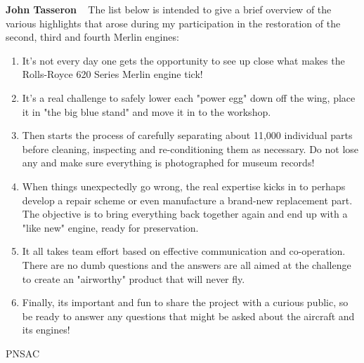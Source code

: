\textbf{John Tasseron}
 
The list below is intended to give a brief overview of the various highlights
that arose during my participation in the restoration of the second, third and
fourth Merlin engines:

\begin{enumerate}
  \item It's not every day one gets the opportunity to see up close what makes
the Rolls-Royce 620 Series Merlin engine tick!
  \item It's a real challenge to safely lower each "power egg" down off the
wing, place it in "the big blue stand" and move it in to the workshop.
  \item Then starts the process of carefully separating about 11,000 individual
parts before cleaning, inspecting and re-conditioning them as necessary. Do not
lose any and make sure everything is photographed for museum records!
  \item When things unexpectedly go wrong, the real expertise kicks in to
perhaps develop a repair scheme or even manufacture a brand-new replacement
part. The objective is to bring everything back together again and end up with
a "like new" engine, ready for preservation.
  \item It all takes team effort based on effective communication and
co-operation. There are no dumb questions and the answers are all aimed at the
challenge to create an "airworthy" product that will never fly.
  \item Finally, its important and fun to share the project with a curious
public, so be ready to answer any questions that might be asked about the
aircraft and its engines!
\end{enumerate}



%
%
%
%
%

\begin{footnotesize}
    \raggedleft PNSAC\\
\end{footnotesize}





